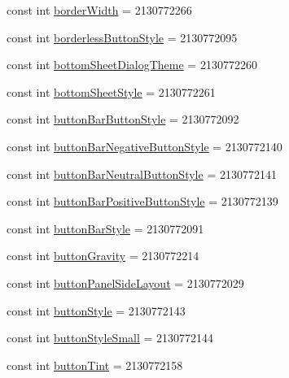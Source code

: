 \begin{CompactItemize}
\item 
const int \hyperlink{class__2doo_1_1_droid_1_1_resource_1_1_attribute_e5c97187a23faf05cf4d6fa01236d6cb}{borderWidth} = 2130772266
\item 
const int \hyperlink{class__2doo_1_1_droid_1_1_resource_1_1_attribute_2bf11357e703438f597e6095d56d7cf4}{borderlessButtonStyle} = 2130772095
\item 
const int \hyperlink{class__2doo_1_1_droid_1_1_resource_1_1_attribute_26a0b24e93163f95a074204be7b3cbfb}{bottomSheetDialogTheme} = 2130772260
\item 
const int \hyperlink{class__2doo_1_1_droid_1_1_resource_1_1_attribute_50a91f5c4d8f09ad85c8767d44faf03d}{bottomSheetStyle} = 2130772261
\item 
const int \hyperlink{class__2doo_1_1_droid_1_1_resource_1_1_attribute_3cea047740efaf7647840f09b44f28de}{buttonBarButtonStyle} = 2130772092
\item 
const int \hyperlink{class__2doo_1_1_droid_1_1_resource_1_1_attribute_36436c2c0438c8d02e5b18f18ecf9271}{buttonBarNegativeButtonStyle} = 2130772140
\item 
const int \hyperlink{class__2doo_1_1_droid_1_1_resource_1_1_attribute_a4abffa134635c77fa3b4e79952acb44}{buttonBarNeutralButtonStyle} = 2130772141
\item 
const int \hyperlink{class__2doo_1_1_droid_1_1_resource_1_1_attribute_6ad2c9a649b968d7aa196c91006319e5}{buttonBarPositiveButtonStyle} = 2130772139
\item 
const int \hyperlink{class__2doo_1_1_droid_1_1_resource_1_1_attribute_e60d096e478f46613697da4c3dac5953}{buttonBarStyle} = 2130772091
\item 
const int \hyperlink{class__2doo_1_1_droid_1_1_resource_1_1_attribute_90681bee86e7dbcc3de833257519d99a}{buttonGravity} = 2130772214
\item 
const int \hyperlink{class__2doo_1_1_droid_1_1_resource_1_1_attribute_72bb77bea81521f10e48f0efc7fea11a}{buttonPanelSideLayout} = 2130772029
\item 
const int \hyperlink{class__2doo_1_1_droid_1_1_resource_1_1_attribute_b154acce8ffadabe60805bea89ef683a}{buttonStyle} = 2130772143
\item 
const int \hyperlink{class__2doo_1_1_droid_1_1_resource_1_1_attribute_38cdd655ab958ef51148910f5f1b0d91}{buttonStyleSmall} = 2130772144
\item 
const int \hyperlink{class__2doo_1_1_droid_1_1_resource_1_1_attribute_303a04c14effa3b8b1dfe92dee81492c}{buttonTint} = 2130772158
\item 

\end{CompactItemize}
